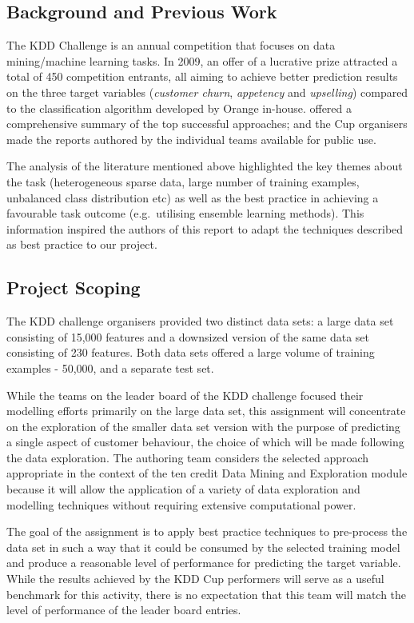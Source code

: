 \documentclass{article}
\begin{document}
\subsection{Background and Previous Work}

The KDD Challenge is an annual competition that focuses on data mining/machine learning tasks.
In 2009, an offer of a lucrative prize attracted a total of 450 competition entrants, all aiming to achieve better prediction results on the three target variables (\emph{customer churn}, \emph{appetency} and \emph{upselling}) compared to the classification algorithm developed by Orange in-house.
\cite{guyon2009analysis} offered a comprehensive summary of the top successful approaches; and the Cup organisers made the reports authored by the individual teams available for public use. 

The analysis of the literature mentioned above highlighted the key themes about the task (heterogeneous sparse data, large number of training examples, unbalanced class distribution etc) as well as the best practice in achieving a favourable task outcome (e.g.\ utilising ensemble learning methods).
This information inspired the authors of this report to adapt the techniques described as best practice to our project.

\subsection{Project Scoping}

The KDD challenge organisers provided two distinct data sets: a large data set consisting of 15,000 features and a downsized version of the same data set consisting of 230 features.
Both data sets offered a large volume of training examples - 50,000, and a separate test set. 

While the teams on the leader board of the KDD challenge focused their modelling efforts primarily on the large data set, this assignment will concentrate on the exploration of the smaller data set version with the purpose of predicting a single aspect of customer behaviour, the choice of which will be made following the data exploration.
The authoring team considers the selected approach appropriate in the context of the ten credit Data Mining and Exploration module because it will allow the application of a variety of data exploration and modelling techniques without requiring extensive computational power.

The goal of the assignment is to apply best practice techniques to pre-process the data set in such a way that it could be consumed by the selected training model and produce a reasonable level of performance for predicting the target variable.
While the results achieved by the KDD Cup performers will serve as a useful benchmark for this activity, there is no expectation that this team will match the level of performance of the leader board entries.
\end{document}
